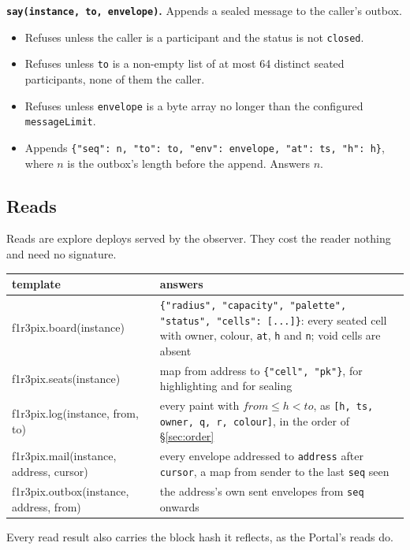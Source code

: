 \documentclass[11pt,a4paper]{article}
\newcommand{\code}[1]{\texttt{#1}}
\begin{document}
\textbf{\code{say(instance, to, envelope)}.} Appends a sealed message to the caller's outbox.
\begin{itemize}[leftmargin=1.2em,itemsep=1pt]
\item Refuses unless the caller is a participant and the status is not \code{closed}.
\item Refuses unless \code{to} is a non-empty list of at most 64 distinct seated participants,
  none of them the caller.
\item Refuses unless \code{envelope} is a byte array no longer than the configured
  \code{messageLimit}.
\item Appends \code{\{"seq": n, "to": to, "env": envelope, "at": ts, "h": h\}}, where $n$ is
  the outbox's length before the append. Answers $n$.
\end{itemize}

\subsection{Reads}

Reads are explore deploys served by the observer. They cost the reader nothing and need no
signature.

\begin{center}\small
\begin{tabularx}{\linewidth}{@{}>{\ttfamily}l X@{}}
\toprule
\normalfont template & answers\\
\midrule
f1r3pix.board(instance)     & \code{\{"radius", "capacity", "palette", "status", "cells": [...]\}}: every seated cell with owner, colour, \code{at}, \code{h} and \code{n}; void cells are absent\\
f1r3pix.seats(instance)     & map from address to \code{\{"cell", "pk"\}}, for highlighting and for sealing\\
f1r3pix.log(instance, from, to) & every paint with $\mathit{from}\le h<\mathit{to}$, as \code{[h, ts, owner, q, r, colour]}, in the order of \S\ref{sec:order}\\
f1r3pix.mail(instance, address, cursor) & every envelope addressed to \code{address} after \code{cursor}, a map from sender to the last \code{seq} seen\\
f1r3pix.outbox(instance, address, from) & the address's own sent envelopes from \code{seq} onwards\\
\bottomrule
\end{tabularx}
\end{center}

Every read result also carries the block hash it reflects, as the Portal's reads do.
\end{document}

